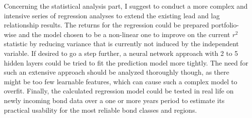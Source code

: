 Concerning the statistical analysis part, I suggest to conduct a more complex and intensive series of regression analyses to extend the existing lead and lag relationship results. The returns for the regression could be prepared portfolio-wise and the model chosen to be a non-linear one to improve on the current $r^2$ statistic by reducing variance that is currently not induced by the independent variable. If desired to go a step further, a neural network approach with 2 to 5 hidden layers could be tried to fit the prediction model more tightly. The need for such an extensive approach should be analyzed thoroughly though, as there might be too few learnable features, which can cause such a complex model to overfit. Finally, the calculated regression model could be tested in real life on newly incoming bond data over a one or more years period to estimate its practical usability for the most reliable bond classes and regions. 
